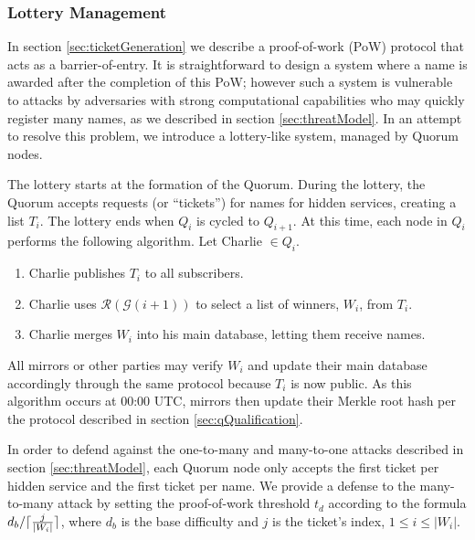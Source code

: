 \documentclass[USenglish,oneside,twocolumn]{article}
\DeclarePairedDelimiter{\ceil}{\lceil}{\rceil}
\newcommand*\nWinners{\left\vert{W_{i}}\right\vert}
\begin{document}
\subsubsection{Lottery Management}
\label{sec:lotteryManagement}

In section \ref{sec:ticketGeneration} we describe a proof-of-work (PoW) protocol that acts as a barrier-of-entry. It is straightforward to design a system where a name is awarded after the completion of this PoW; however such a system is vulnerable to attacks by adversaries with strong computational capabilities who may quickly register many names, as we described in section \ref{sec:threatModel}. In an attempt to resolve this problem, we introduce a lottery-like system, managed by Quorum nodes.

The lottery starts at the formation of the Quorum. During the lottery, the Quorum accepts requests (or ``tickets'') for names for hidden services, creating a list $ T_{i} $. The lottery ends when $ Q_{i} $ is cycled to $ Q_{i + 1} $. At this time, each node in $ Q_{i} $ performs the following algorithm. Let Charlie $ \in Q_{i} $.

\begin{enumerate}
	\item Charlie publishes $ T_{i} $ to all subscribers.
	\item Charlie uses $ \mathcal{R}(\mathcal{G}(i + 1)) $ to select a list of winners, $ W_{i} $, from $ T_{i} $. 
	\item Charlie merges $ W_{i} $ into his main database, letting them receive names.
\end{enumerate}

All mirrors or other parties may verify $ W_{i} $ and update their main database accordingly through the same protocol because $ T_{i} $ is now public. As this algorithm occurs at 00:00 UTC, mirrors then update their Merkle root hash per the protocol described in section \ref{sec:qQualification}.

In order to defend against the one-to-many and many-to-one attacks described in section \ref{sec:threatModel}, each Quorum node only accepts the first ticket per hidden service and the first ticket per name. We provide a defense to the many-to-many attack by setting the proof-of-work threshold $ t_{d} $ according to the formula $ d_{b} / \ceil{\frac{j}{\nWinners}} $, where $ d_{b} $ is the base difficulty and $ j $ is the ticket's index, $ 1 \leq i \leq \nWinners $.

%
%
\end{document}
